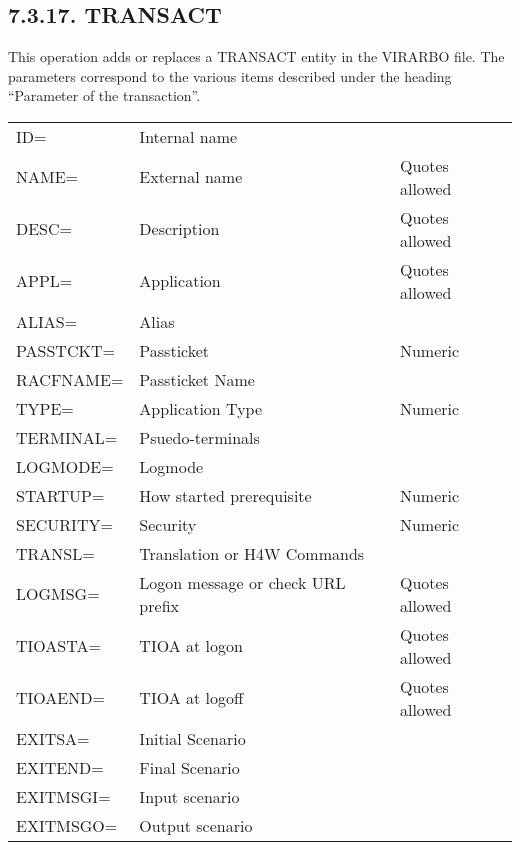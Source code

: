 \documentclass[letterpaper,10pt,english]{sphinxmanual}
\begin{document}
\subsection{7.3.17. TRANSACT}
\label{\detokenize{Installation_Guide:transact}}
This operation adds or replaces a TRANSACT entity in the VIRARBO file. The parameters correspond to the various items described under the heading “Parameter of the transaction”.


\begin{savenotes}\sphinxattablestart
\centering
\begin{tabulary}{\linewidth}[t]{|T|T|T|}
\hline
{}\relax &\relax &\relax \\
\hline
ID=
&
Internal name
&\\
\hline
NAME=
&
External name
&
Quotes allowed
\\
\hline
DESC=
&
Description
&
Quotes allowed
\\
\hline
APPL=
&
Application
&
Quotes allowed
\\
\hline
ALIAS=
&
Alias
&\\
\hline
PASSTCKT=
&
Passticket
&
Numeric
\\
\hline
RACFNAME=
&
Passticket Name
&\\
\hline
TYPE=
&
Application Type
&
Numeric
\\
\hline
TERMINAL=
&
Psuedo-terminals
&\\
\hline
LOGMODE=
&
Logmode
&\\
\hline
STARTUP=
&
How started
prerequisite
&
Numeric
\\
\hline
SECURITY=
&
Security
&
Numeric
\\
\hline
TRANSL=
&
Translation or H4W
Commands
&\\
\hline
LOGMSG=
&
Logon message or
check URL prefix
&
Quotes allowed
\\
\hline
TIOASTA=
&
TIOA at logon
&
Quotes allowed
\\
\hline
TIOAEND=
&
TIOA at logoff
&
Quotes allowed
\\
\hline
EXITSA=
&
Initial Scenario
&\\
\hline
EXITEND=
&
Final Scenario
&\\
\hline
EXITMSGI=
&
Input scenario
&\\
\hline
EXITMSGO=
&
Output scenario
&\\
\hline
\end{tabulary}
\par
\sphinxattableend\end{savenotes}
\end{document}

